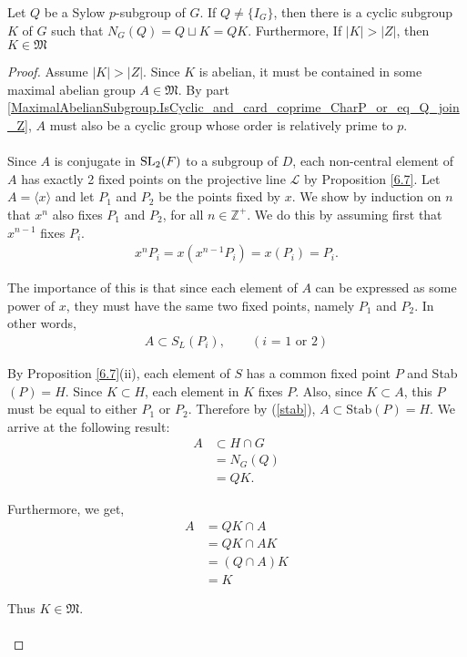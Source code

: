 \begin{theorem}
  \label{MaximalAbelianSubgroup.K_mem_MaximalAbelianSubgroups_of_center_lt_card_K}
  Let $Q$ be a Sylow $p$-subgroup of $G$. If $Q \neq \{I_G\}$, then there is a cyclic subgroup $K$ of $G$ such that $N_G(Q) = Q \sqcup K = QK$. Furthermore, If $|K| > |Z|$, then $K \in \mathfrak{M}$
\end{theorem}
\begin{proof} 
Assume $|K| > |Z|$. Since $K$ is abelian, it must be contained in some maximal abelian group $A \in \mathfrak{M}$. By part \ref{MaximalAbelianSubgroup.IsCyclic_and_card_coprime_CharP_or_eq_Q_join_Z}, $A$ must also be a cyclic group whose order is relatively prime to $p$. \\
\\
Since $A$ is conjugate in $\operatorname{SL}_2(F)$ to a subgroup of $D$, each non-central element of $A$ has exactly 2 fixed points on the projective line $\mathscr{L}$ by Proposition \ref{6.7}. Let $A = \langle x \rangle$ and let $P_1$ and $P_2$ be the points fixed by $x$. We show by induction on $n$ that $x^n$ also fixes $P_1$ and $P_2$, for all $n \in \mathbb{Z^+}$. We do this by assuming first that $x^{n-1}$ fixes $P_i$.
\begin{align*} x^n P_i = x(x^{n-1} P_i) = x (P_i) = P_i.
\end{align*}

The importance of this is that since each element of $A$ can be expressed as some power of $x$, they must have the same two fixed points, namely $P_1$ and $P_2$. In other words, 
\begin{align}\label{stab} A \subset S_L(P_i), \qquad (\text{$i$ = 1 or 2})
\end{align}

By Proposition \ref{6.7}(ii), each element of $S$ has a common fixed point $P$ and Stab$(P) = H$. Since $K \subset H$, each element in $K$ fixes $P$. Also, since $K \subset A$, this $P$ must be equal to either $P_1$ or $P_2$. Therefore by (\ref{stab}), $A \subset \text{Stab}(P) = H$. We arrive at the following result:
\begin{align*} A &\subset H \cap G 
\\ &= N_G(Q) %
\\ &= QK. %
\end{align*}

Furthermore, we get,
\begin{align*} A &= QK \cap A
\\ &= QK \cap AK \tag{$K \subset A$ so $A = AK$}
\\ &= (Q \cap A)K
\\ &= K \tag{$Q \cap A = I_G$}
\end{align*}

Thus $K \in \mathfrak{M}$.\\
\\
\end{proof}
